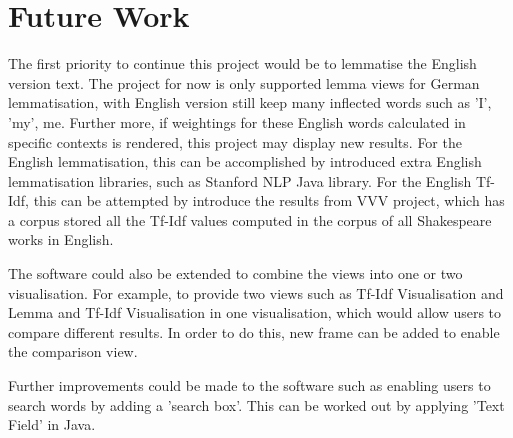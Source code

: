 \section{Future Work}
The first priority to continue this project would be to lemmatise the English version text. The project for now is only supported lemma views for German lemmatisation, with English version still keep many inflected words such as 'I', 'my', me. Further more, if weightings for these English words calculated in specific contexts is rendered, this project may display new results. For the English lemmatisation, this can be accomplished by introduced extra English lemmatisation libraries, such as Stanford NLP Java library. For the English Tf-Idf, this can be attempted by introduce the results from VVV project, which has a corpus stored all the Tf-Idf values computed in the corpus of all Shakespeare works in English.

The software could also be extended to combine the views into one or two visualisation. For example, to provide two views such as Tf-Idf Visualisation and Lemma and Tf-Idf Visualisation in one visualisation, which would allow users to compare different results. In order to do this, new frame can be added to enable the comparison view.

Further improvements could be made to the software such as enabling users to search words by adding a 'search box'. This can be worked out by applying 'Text Field' in Java.
